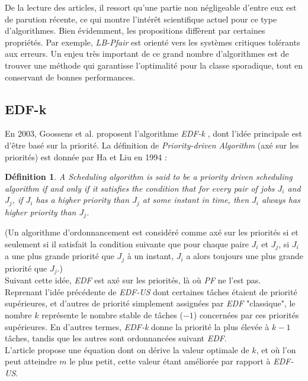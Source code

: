 \documentclass[11pt,a4paper,oneside]{report}
\newtheorem{mydef}{Définition}
\begin{document}
De la lecture des articles, il ressort qu'une partie non négligeable d'entre eux 
est de parution récente, ce qui montre l'intérêt scientifique actuel pour ce type d'algorithmes. 
Bien évidemment, les propositions diffèrent par certaines propriétés. Par exemple, 
\textit{LB-Pfair} est orienté vers les systèmes critiques tolérants aux erreurs. 
Un enjeu très important de ce grand nombre d'algorithmes est de trouver une méthode qui 
garantisse l'optimalité pour la classe sporadique, tout en conservant de bonnes performances. 

\subsection{EDF-k}
En 2003, Goossens et al. proposent l'algorithme \textit{EDF-k} \cite{goossens_priority-driven_2003}, 
dont l'idée principale est d'être basé sur la priorité. 
La définition de \textit{Priority-driven Algorithm} (axé sur les priorités) 
est donnée par Ha et Liu en 1994 :
\begin{mydef}
	A Scheduling algorithm is said to be a priority driven scheduling algorithm if and 
	only if it satisfies the condition 
	that for every pair of jobs $J_i$ and $J_j$, if $J_i$ has a higher priority than $J_j$ at 
	some instant in time, then $J_i$ always has higher priority than $J_j$.
\end{mydef}
(Un algorithme d'ordonnancement est considéré comme axé sur les priorités si et seulement si il 
satisfait la condition suivante que pour chaque paire $J_i$ et $J_j$, si $J_i$ a une plus 
grande priorité que $J_j$ à un instant, $J_i$ a alors toujours une plus grande priorité 
que $J_j$.)\\
Suivant cette idée, \textit{EDF} est axé sur les priorités, là où \textit{PF} ne l'est pas.\\

Reprenant l'idée précédente de \textit{EDF-US} dont certaines tâches étaient de priorité 
supérieures, et d'autres de priorité simplement assignées par \textit{EDF} "classique", 
le nombre $k$ représente le nombre stable de tâches ($-1$) concernées par ces priorités 
supérieures. En d'autres termes, \textit{EDF-k} donne la priorité la plus élevée à 
$k - 1$ tâches, tandis que les autres sont ordonnancées suivant \textit{EDF}.\\

L'article propose une équation dont on dérive la valeur optimale de $k$, et où l'on peut 
atteindre $m$ le plus petit, cette valeur étant améliorée par rapport à \textit{EDF-US}.\\
\end{document}
